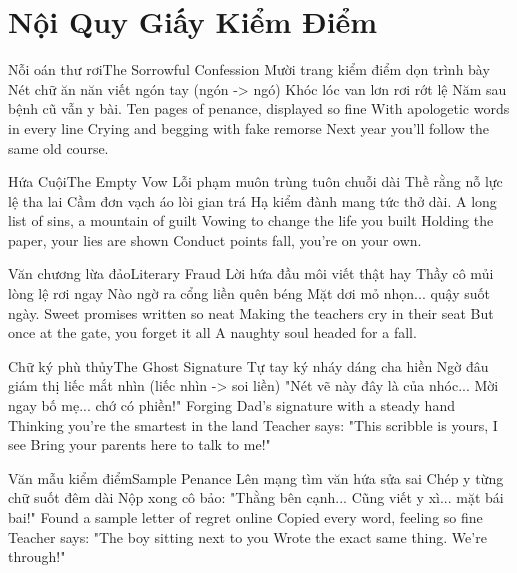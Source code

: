 \chapter{Nội Quy Giấy Kiểm Điểm}

\begin{tutuyetbox}{Nỗi oán thư rơi}{The Sorrowful Confession}
Mười trang kiểm điểm dọn trình bày
Nét chữ ăn năn viết ngón tay (ngón -> ngó)
Khóc lóc van lơn rơi rớt lệ
Năm sau bệnh cũ vẫn y bài.
\tcblower
Ten pages of penance, displayed so fine 
With apologetic words in every line 
Crying and begging with fake remorse 
Next year you'll follow the same old course.
\end{tutuyetbox}

\begin{tutuyetbox}{Hứa Cuội}{The Empty Vow}
Lỗi phạm muôn trùng tuôn chuỗi dài
Thề rằng nỗ lực lệ tha lai
Cầm đơn vạch áo lòi gian trá
Hạ kiểm đành mang tức thở dài.
\tcblower
A long list of sins, a mountain of guilt 
Vowing to change the life you built 
Holding the paper, your lies are shown 
Conduct points fall, you're on your own.
\end{tutuyetbox}

\begin{tutuyetbox}{Văn chương lừa đảo}{Literary Fraud}
Lời hứa đầu môi viết thật hay
Thầy cô mủi lòng lệ rơi ngay
Nào ngờ ra cổng liền quên béng
Mặt dơi mỏ nhọn... quậy suốt ngày.
\tcblower
Sweet promises written so neat
Making the teachers cry in their seat
But once at the gate, you forget it all
A naughty soul headed for a fall.
\end{tutuyetbox}

\begin{tutuyetbox}{Chữ ký phù thủy}{The Ghost Signature}
Tự tay ký nháy dáng cha hiền
Ngờ đâu giám thị liếc mắt nhìn (liếc nhìn -> soi liền)
"Nét vẽ này đây là của nhóc...
Mời ngay bố mẹ... chớ có phiền!"
\tcblower
Forging Dad's signature with a steady hand
Thinking you're the smartest in the land
Teacher says: "This scribble is yours, I see
Bring your parents here to talk to me!"
\end{tutuyetbox}

\begin{tutuyetbox}{Văn mẫu kiểm điểm}{Sample Penance}
Lên mạng tìm văn hứa sửa sai
Chép y từng chữ suốt đêm dài
Nộp xong cô bảo: "Thằng bên cạnh...
Cũng viết y xì... mặt bái bai!"
\tcblower
Found a sample letter of regret online
Copied every word, feeling so fine
Teacher says: "The boy sitting next to you
Wrote the exact same thing. We're through!"
\end{tutuyetbox}

